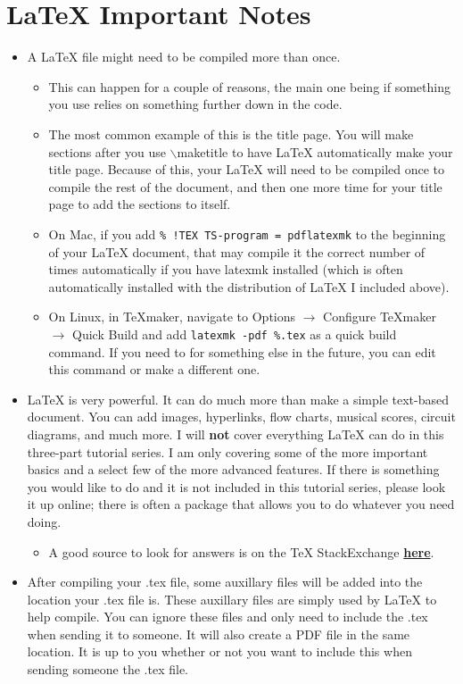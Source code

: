 \documentclass{article}
\begin{document}
	\section{\LaTeX{} Important Notes}
		\begin{itemize}
			\item A \LaTeX{} file might need to be compiled more than once.
			\begin{itemize}
				\item This can happen for a couple of reasons, the main one being if something you use relies on something further down in the code.
				\item The most common example of this is the title page. You will make sections after you use $\backslash$maketitle to have \LaTeX{} automatically make your title page. Because of this, your \LaTeX{} will need to be compiled once to compile the rest of the document, and then one more time for your title page to add the sections to itself.
				\item On Mac, if you add \texttt{\% !TEX TS-program = pdflatexmk} to the beginning of your \LaTeX{} document, that may compile it the correct number of times automatically if you have latexmk installed (which is often automatically installed with the distribution of \LaTeX{} I included above).
				\item On Linux, in TeXmaker, navigate to Options \(\rightarrow\) Configure TeXmaker \(\rightarrow\) Quick Build and add \texttt{latexmk -pdf \%.tex} as a quick build command. If you need to for something else in the future, you can edit this command or make a different one.
			\end{itemize}
			\item \LaTeX{} is very powerful. It can do much more than make a simple text-based document. You can add images, hyperlinks, flow charts, musical scores, circuit diagrams, and much more. I will \textbf{not} cover everything \LaTeX{} can do in this three-part tutorial series. I am only covering some of the more important basics and a select few of the more advanced features. If there is something you would like to do and it is not included in this tutorial series, please look it up online; there is often a package that allows you to do whatever you need doing.
			\begin{itemize}
				\item A good source to look for answers is on the \TeX{} StackExchange \href{https://tex.stackexchange.com/}{\textbf{here}}.
			\end{itemize}
			\item After compiling your .tex file, some auxillary files will be added into the location your .tex file is. These auxillary files are simply used by \LaTeX{} to help compile. You can ignore these files and only need to include the .tex when sending it to someone. It will also create a PDF file in the same location. It is up to you whether or not you want to include this when sending someone the .tex file.
		\end{itemize}
		
\end{document}
